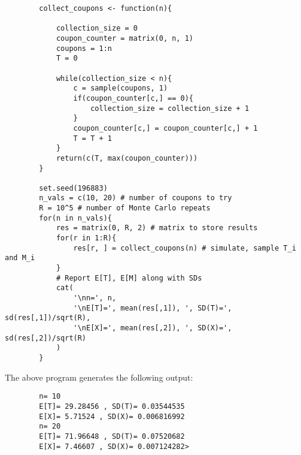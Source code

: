 \documentclass[11pt, letterpaper]{article}
\begin{document}
    \begin{verbatim}
        collect_coupons <- function(n){

            collection_size = 0
            coupon_counter = matrix(0, n, 1)
            coupons = 1:n
            T = 0

            while(collection_size < n){
                c = sample(coupons, 1)
                if(coupon_counter[c,] == 0){
                    collection_size = collection_size + 1
                }
                coupon_counter[c,] = coupon_counter[c,] + 1
                T = T + 1
            }
            return(c(T, max(coupon_counter)))
        }

        set.seed(196883)
        n_vals = c(10, 20) # number of coupons to try
        R = 10^5 # number of Monte Carlo repeats
        for(n in n_vals){
            res = matrix(0, R, 2) # matrix to store results
            for(r in 1:R){
                res[r, ] = collect_coupons(n) # simulate, sample T_i and M_i
            }
            # Report E[T], E[M] along with SDs
            cat(
                '\nn=', n,
                '\nE[T]=', mean(res[,1]), ', SD(T)=', sd(res[,1])/sqrt(R),
                '\nE[X]=', mean(res[,2]), ', SD(X)=', sd(res[,2])/sqrt(R)
            )
        }
    \end{verbatim} 
    The above program generates the following output:
    \begin{verbatim}
        n= 10 
        E[T]= 29.28456 , SD(T)= 0.03544535 
        E[X]= 5.71524 , SD(X)= 0.006816992
        n= 20 
        E[T]= 71.96648 , SD(T)= 0.07520682 
        E[X]= 7.46607 , SD(X)= 0.007124282> 
    \end{verbatim}
\end{document}
